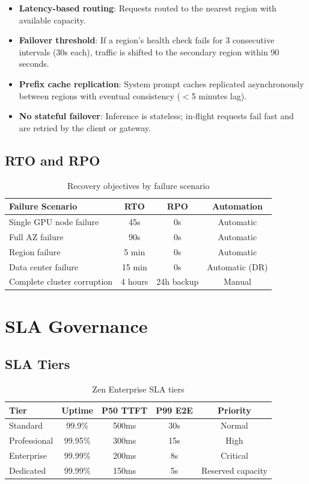 \documentclass[11pt,a4paper]{article}
\begin{document}
\begin{itemize}
  \item \textbf{Latency-based routing}: Requests routed to the nearest region with available capacity.
  \item \textbf{Failover threshold}: If a region's health check fails for 3 consecutive intervals (30s each), traffic is shifted to the secondary region within 90 seconds.
  \item \textbf{Prefix cache replication}: System prompt caches replicated asynchronously between regions with eventual consistency ($<$5 minutes lag).
  \item \textbf{No stateful failover}: Inference is stateless; in-flight requests fail fast and are retried by the client or gateway.
\end{itemize}

\subsection{RTO and RPO}

\begin{table}[H]
\centering
\caption{Recovery objectives by failure scenario}
\label{tab:recovery}
\begin{tabular}{lccc}
\toprule
Failure Scenario & RTO & RPO & Automation \\
\midrule
Single GPU node failure & 45s & 0s & Automatic \\
Full AZ failure & 90s & 0s & Automatic \\
Region failure & 5 min & 0s & Automatic \\
Data center failure & 15 min & 0s & Automatic (DR) \\
Complete cluster corruption & 4 hours & 24h backup & Manual \\
\bottomrule
\end{tabular}
\end{table}

\section{SLA Governance}

\subsection{SLA Tiers}

\begin{table}[H]
\centering
\caption{Zen Enterprise SLA tiers}
\label{tab:sla}
\begin{tabular}{lcccc}
\toprule
Tier & Uptime & P50 TTFT & P99 E2E & Priority \\
\midrule
Standard & 99.9\% & 500ms & 30s & Normal \\
Professional & 99.95\% & 300ms & 15s & High \\
Enterprise & 99.99\% & 200ms & 8s & Critical \\
Dedicated & 99.99\% & 150ms & 5s & Reserved capacity \\
\bottomrule
\end{tabular}
\end{table}
\end{document}
